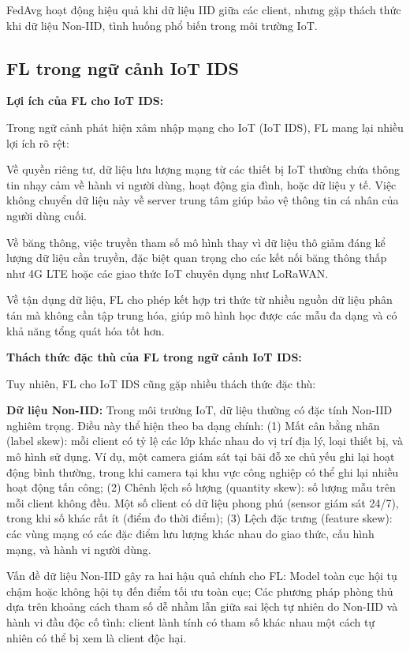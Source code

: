 FedAvg hoạt động hiệu quả khi dữ liệu IID giữa các client, nhưng gặp thách thức khi dữ liệu Non-IID, tình huống phổ biến trong môi trường IoT.

\subsection{FL trong ngữ cảnh IoT IDS}
\textbf{Lợi ích của FL cho IoT IDS:}

Trong ngữ cảnh phát hiện xâm nhập mạng cho IoT (IoT IDS), FL mang lại nhiều lợi ích rõ rệt:

Về quyền riêng tư, dữ liệu lưu lượng mạng từ các thiết bị IoT thường chứa thông tin nhạy cảm về hành vi người dùng, hoạt động gia đình, hoặc dữ liệu y tế. Việc không chuyển dữ liệu này về server trung tâm giúp bảo vệ thông tin cá nhân của người dùng cuối.

Về băng thông, việc truyền tham số mô hình thay vì dữ liệu thô giảm đáng kể lượng dữ liệu cần truyền, đặc biệt quan trọng cho các kết nối băng thông thấp như 4G LTE hoặc các giao thức IoT chuyên dụng như LoRaWAN.

Về tận dụng dữ liệu, FL cho phép kết hợp tri thức từ nhiều nguồn dữ liệu phân tán mà không cần tập trung hóa, giúp mô hình học được các mẫu đa dạng và có khả năng tổng quát hóa tốt hơn.

\textbf{Thách thức đặc thù của FL trong ngữ cảnh IoT IDS:}

Tuy nhiên, FL cho IoT IDS cũng gặp nhiều thách thức đặc thù:

\textbf{Dữ liệu Non-IID:} Trong môi trường IoT, dữ liệu thường có đặc tính Non-IID nghiêm trọng. Điều này thể hiện theo ba dạng chính: (1) Mất cân bằng nhãn (label skew): mỗi client có tỷ lệ các lớp khác nhau do vị trí địa lý, loại thiết bị, và mô hình sử dụng. Ví dụ, một camera giám sát tại bãi đỗ xe chủ yếu ghi lại hoạt động bình thường, trong khi camera tại khu vực công nghiệp có thể ghi lại nhiều hoạt động tấn công; (2) Chênh lệch số lượng (quantity skew): số lượng mẫu trên mỗi client không đều. Một số client có dữ liệu phong phú (sensor giám sát 24/7), trong khi số khác rất ít (điểm đo thời điểm); (3) Lệch đặc trưng (feature skew): các vùng mạng có các đặc điểm lưu lượng khác nhau do giao thức, cấu hình mạng, và hành vi người dùng.

Vấn đề dữ liệu Non-IID gây ra hai hậu quả chính cho FL: Model toàn cục hội tụ chậm hoặc không hội tụ đến điểm tối ưu toàn cục; Các phương pháp phòng thủ dựa trên khoảng cách tham số dễ nhầm lẫn giữa sai lệch tự nhiên do Non-IID và hành vi đầu độc cố tình: client lành tính có tham số khác nhau một cách tự nhiên có thể bị xem là client độc hại.

